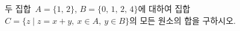 두 집합~$A=\{1,\,2\}$, $B=\{0,\,1,\,2,\,4\}$에 대하여 집합~$C=\{z \mid z=x+y,\ x\in A,\ y\in B\}$의 모든 원소의 합을 구하시오.
